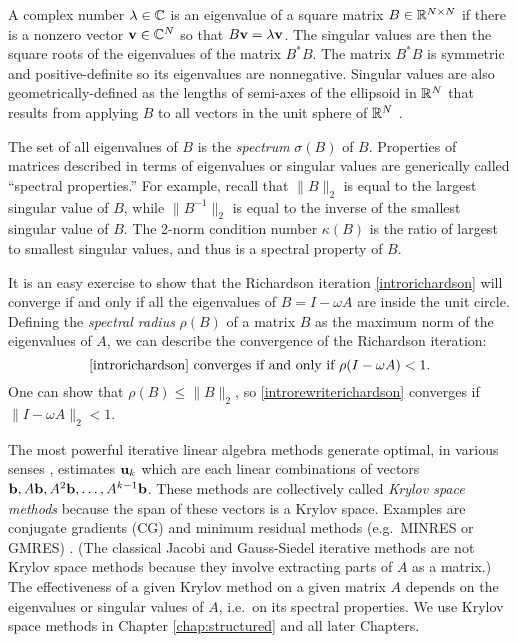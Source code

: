 A complex number $\lambda \in \mathbb{C}$ is an eigenvalue of a square matrix $B\in\mathbb{R}^{N\times N}$ if there is a nonzero vector $\mathbf{v}\in\mathbb{C}^N$ so that $B \mathbf{v} = \lambda \mathbf{v}$.  The singular values are then the square roots of the eigenvalues of the matrix $B^*B$.  The matrix $B^*B$ is symmetric and positive-definite so its eigenvalues are nonnegative.  Singular values are also geometrically-defined as the lengths of semi-axes of the ellipsoid in $\mathbb{R}^N$ that results from applying $B$ to all vectors in the unit sphere of $\mathbb{R}^N$ \citep{TrefethenBau}.

The set of all eigenvalues of $B$ is the \emph{spectrum} $\sigma(B)$ of $B$.  Properties of matrices described in terms of eigenvalues or singular values are generically called ``spectral properties.''  For example, recall that $\|B\|_2$ is equal to the largest singular value of $B$, while $\|B^{-1}\|_2$ is equal to the inverse of the smallest singular value of $B$.  The 2-norm condition number $\kappa(B)$ is the ratio of largest to smallest singular values, and thus is a spectral property of $B$.

It is an easy exercise to show that the Richardson iteration \eqref{introrichardson} will converge if and only if all the eigenvalues of $B=I-\omega A$ are inside the unit circle.  Defining the \emph{spectral radius} $\rho(B)$ of a matrix $B$ as the maximum norm of the eigenvalues of $A$, we can describe the convergence of the Richardson iteration:
\begin{equation}
\text{\eqref{introrichardson} converges if and only if } \rho(I-\omega A) < 1. \label{introconvergethm}
\end{equation}
One can show that $\rho(B) \le \|B\|_2$, so \eqref{introrewriterichardson} converges if $\|I-\omega A\|_2 < 1$.

The most powerful iterative linear algebra methods generate optimal, in various senses \citep{TrefethenBau}, estimates $\mathbf{u}_k$ which are each linear combinations of vectors $\mathbf{b},A\mathbf{b},A^2\mathbf{b},\dots,A^{k-1}\mathbf{b}$.  These methods are collectively called \emph{Krylov space methods} because the span of these vectors is a Krylov space.  Examples are conjugate gradients (CG) and minimum residual methods (e.g.~MINRES or GMRES) \citep{Greenbaum1997}.  (The classical Jacobi and Gauss-Siedel iterative methods are not Krylov space methods because they involve extracting parts of $A$ as a matrix.)  The effectiveness of a given Krylov method on a given matrix $A$ depends on the eigenvalues or singular values of $A$, i.e.~on its spectral properties.  We use Krylov space methods in Chapter \ref{chap:structured} and all later Chapters.

